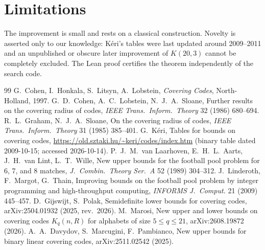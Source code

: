 \documentclass[11pt]{article}
\numberwithin{equation}{section}
\theoremstyle{definition}
\theoremstyle{remark}
\begin{document}
\section{Limitations}
The improvement is small and rests on a classical construction. Novelty is asserted only to our
knowledge: Kéri's tables were last updated around 2009--2011 and an unpublished or obscure later
improvement of $K(20,3)$ cannot be completely excluded. The Lean proof certifies the theorem
independently of the search code.

\begin{thebibliography}{99}
 G.~Cohen, I.~Honkala, S.~Litsyn, A.~Lobstein, \emph{Covering Codes}, North-Holland, 1997.
 G.~D.~Cohen, A.~C.~Lobstein, N.~J.~A.~Sloane, Further results on the covering radius of
codes, \emph{IEEE Trans.\ Inform.\ Theory} 32 (1986) 680--694.
 R.~L.~Graham, N.~J.~A.~Sloane, On the covering radius of codes, \emph{IEEE Trans.\ Inform.\
Theory} 31 (1985) 385--401.
 G.~Kéri, Tables for bounds on covering codes,
\url{https://old.sztaki.hu/~keri/codes/index.htm} (binary table dated 2009-10-15; accessed 2026-10-14).
\bibitem{vLAvLW89} P.~J.~M.~van Laarhoven, E.~H.~L.~Aarts, J.~H.~van Lint, L.~T.~Wille, New upper bounds for
the football pool problem for 6, 7, and 8 matches, \emph{J.\ Combin.\ Theory Ser.\ A} 52 (1989) 304--312.
\bibitem{LMT09} J.~Linderoth, F.~Margot, G.~Thain, Improving bounds on the football pool problem by
integer programming and high-throughput computing, \emph{INFORMS J.\ Comput.} 21 (2009) 445--457.
\bibitem{GijswijtPolak25} D.~Gijswijt, S.~Polak, Semidefinite lower bounds for covering codes,
arXiv:2504.01932 (2025, rev.\ 2026).
 M.~Marosi, New upper and lower bounds on covering codes $K_q(n,R)$ for alphabets of
size $5\le q\le21$, arXiv:2608.19872 (2026).
 A.~A.~Davydov, S.~Marcugini, F.~Pambianco, New upper bounds for binary linear covering
codes, arXiv:2511.02542 (2025).
\end{thebibliography}
\end{document}
